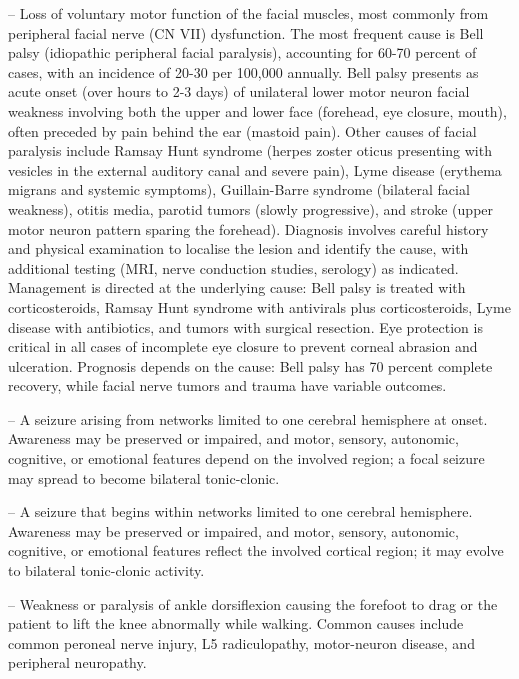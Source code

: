 -- Loss of voluntary motor function of the facial muscles, most commonly from peripheral facial nerve (CN VII) dysfunction. The most frequent cause is Bell palsy (idiopathic peripheral facial paralysis), accounting for 60-70 percent of cases, with an incidence of 20-30 per 100,000 annually. Bell palsy presents as acute onset (over hours to 2-3 days) of unilateral lower motor neuron facial weakness involving both the upper and lower face (forehead, eye closure, mouth), often preceded by pain behind the ear (mastoid pain). Other causes of facial paralysis include Ramsay Hunt syndrome (herpes zoster oticus presenting with vesicles in the external auditory canal and severe pain), Lyme disease (erythema migrans and systemic symptoms), Guillain-Barre syndrome (bilateral facial weakness), otitis media, parotid tumors (slowly progressive), and stroke (upper motor neuron pattern sparing the forehead). Diagnosis involves careful history and physical examination to localise the lesion and identify the cause, with additional testing (MRI, nerve conduction studies, serology) as indicated. Management is directed at the underlying cause: Bell palsy is treated with corticosteroids, Ramsay Hunt syndrome with antivirals plus corticosteroids, Lyme disease with antibiotics, and tumors with surgical resection. Eye protection is critical in all cases of incomplete eye closure to prevent corneal abrasion and ulceration. Prognosis depends on the cause: Bell palsy has 70 percent complete recovery, while facial nerve tumors and trauma have variable outcomes.

-- A seizure arising from networks limited to one cerebral hemisphere at onset. Awareness may be preserved or impaired, and motor, sensory, autonomic, cognitive, or emotional features depend on the involved region; a focal seizure may spread to become bilateral tonic-clonic.

-- A seizure that begins within networks limited to one cerebral hemisphere. Awareness may be preserved or impaired, and motor, sensory, autonomic, cognitive, or emotional features reflect the involved cortical region; it may evolve to bilateral tonic-clonic activity.

-- Weakness or paralysis of ankle dorsiflexion causing the forefoot to drag or the patient to lift the knee abnormally while walking. Common causes include common peroneal nerve injury, L5 radiculopathy, motor-neuron disease, and peripheral neuropathy.

